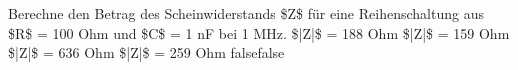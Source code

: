     {Berechne den Betrag des Scheinwiderstands \$Z\$ für eine Reihenschaltung aus \$R\$ = 100 Ohm und \$C\$ = 1 nF bei 1 MHz.}
    {\$|Z|\$ = 188 Ohm}
    {\$|Z|\$ = 159 Ohm}
    {\$|Z|\$ = 636 Ohm}
    {\$|Z|\$ = 259 Ohm}
    {false}{false}